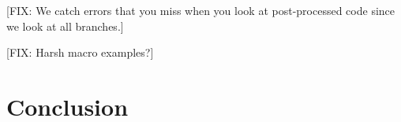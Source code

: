 [FIX: We catch errors that you miss when you look at post-processed code
since we look at all branches.]

[FIX: Harsh macro examples?]

\section{Conclusion}\label{sec:conclusion}

\small 



